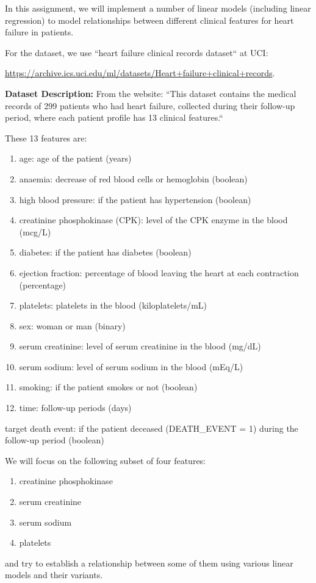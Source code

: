 \documentclass[../../assignment4.tex]{subfiles}
\begin{document}
    In this assignment, we will implement a number of linear models (including linear regression) to model relationships between different clinical features for heart failure in patients.

    For the dataset, we use ``heart failure clinical records dataset`` at UCI: \par
    \url{https://archive.ics.uci.edu/ml/datasets/Heart+failure+clinical+records}.

    \textbf{Dataset Description: } From the website: ``This dataset contains the medical records of 299 patients who had heart failure, collected during their follow-up period, where each patient profile has 13 clinical features.``

    These 13 features are:

    \begin{enumerate}
        \item age: age of the patient (years)
        \item anaemia: decrease of red blood cells or hemoglobin (boolean)
        \item high blood pressure: if the patient has hypertension (boolean)
        \item creatinine phosphokinase (CPK): level of the CPK enzyme in the blood (mcg/L)
        \item diabetes: if the patient has diabetes (boolean)
        \item ejection fraction: percentage of blood leaving the heart at each contraction (percentage)
        \item platelets: platelets in the blood (kiloplatelets/mL)
        \item sex: woman or man (binary)
        \item serum creatinine: level of serum creatinine in the blood (mg/dL)
        \item serum sodium: level of serum sodium in the blood (mEq/L)
        \item smoking: if the patient smokes or not (boolean)
        \item time: follow-up periods (days)
    \end{enumerate}

    target death event: if the patient deceased (DEATH\_EVENT = 1) during the follow-up period (boolean)

    We will focus on the following subset of four features:
    \begin{enumerate}
        \item creatinine phosphokinase
        \item serum creatinine
        \item serum sodium
        \item platelets
    \end{enumerate}
    and try to establish a relationship between some of them using various linear models and their variants.

    \newpage
\end{document}

